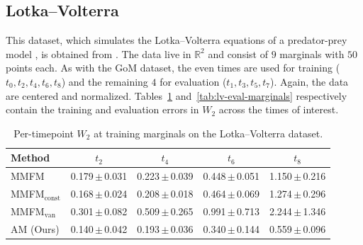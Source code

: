 \documentclass[12pt]{article}
\theoremstyle{plain}
\theoremstyle{plain}
\theoremstyle{remark}
\newcommand{\R}{\mathbb{R}}
\newcommand{\1}{\bm{1}}
\providecommand{\wentry}[2]{#1\,{\color{stdgray}$\pm$\,#2}}
\theoremstyle{plain}
\theoremstyle{definition}
\theoremstyle{remark}
\begin{document}
\subsection{Lotka--Volterra}\label{app:lv}
This dataset, which simulates the Lotka--Volterra equations of a predator-prey model \citep{goel1971volterra}, is obtained from \citet{shen2024multi}. The data live in $\R^2$ and consist of $9$ marginals with $50$ points each. As with the GoM dataset, the even times are used for training ($t_0, t_2, t_4, t_6, t_8$) and the remaining $4$ for evaluation ($t_1, t_3, t_5, t_7$). Again, the data are centered and normalized. Tables~\ref{tab:lv-training-marginals} and~\ref{tab:lv-eval-marginals} respectively contain the training and evaluation errors in $W_2$ across the times of interest.

\begin{table}[t]
\centering
\caption{Per-timepoint $W_2$ at training marginals on the Lotka--Volterra dataset.}
\label{tab:lv-training-marginals}
\begin{tabular}{lcccc}
Method & $t_2$ & $t_4$ & $t_6$ & $t_8$ \\
\midrule
MMFM & \wentry{0.179}{0.031} & \wentry{0.223}{0.039} & \wentry{0.448}{0.051} & \wentry{1.150}{0.216} \\
MMFM$_{\mathrm{const}}$ & \wentry{0.168}{0.024} & \wentry{0.208}{0.018} & \wentry{0.464}{0.069} & \wentry{1.274}{0.296} \\
MMFM$_{\mathrm{van}}$ & \wentry{0.301}{0.082} & \wentry{0.509}{0.265} & \wentry{0.991}{0.713} & \wentry{2.244}{1.346} \\
AM (Ours) & \wentry{0.140}{0.042} & \wentry{0.193}{0.036} & \wentry{0.340}{0.144} & \wentry{0.559}{0.096} \\
\end{tabular}
\end{table}
\end{document}
